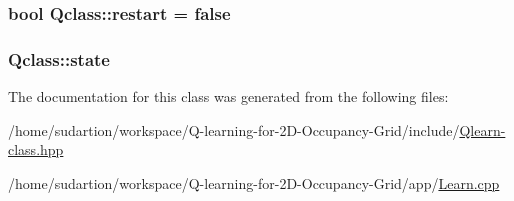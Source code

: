 \subsubsection[{\texorpdfstring{restart}{restart}}]{\setlength{\rightskip}{0pt plus 5cm}bool Qclass\+::restart = false}\hypertarget{classQclass_a04ec3a45dc94d48bf13e27c3f18b8399}{}\label{classQclass_a04ec3a45dc94d48bf13e27c3f18b8399}
\subsubsection[{\texorpdfstring{state}{state}}]{\setlength{\rightskip}{0pt plus 5cm}Qclass\+::state}\hypertarget{classQclass_ac7e42ac35f89616a6036aabd29e928f7}{}\label{classQclass_ac7e42ac35f89616a6036aabd29e928f7}


The documentation for this class was generated from the following files\+:\begin{DoxyCompactItemize}
\item 
/home/sudartion/workspace/\+Q-\/learning-\/for-\/2\+D-\/\+Occupancy-\/\+Grid/include/\hyperlink{Qlearn-class_8hpp}{Qlearn-\/class.\+hpp}\item 
/home/sudartion/workspace/\+Q-\/learning-\/for-\/2\+D-\/\+Occupancy-\/\+Grid/app/\hyperlink{Learn_8cpp}{Learn.\+cpp}\end{DoxyCompactItemize}
